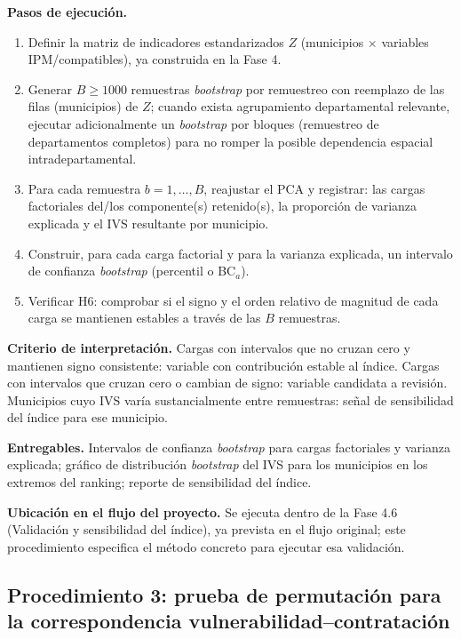 \documentclass[11pt,letterpaper]{article}
\begin{document}
\textbf{Pasos de ejecución.}
\begin{enumerate}
\item Definir la matriz de indicadores estandarizados $Z$ (municipios $\times$
variables IPM/compatibles), ya construida en la Fase 4.
\item Generar $B \geq 1000$ remuestras \textit{bootstrap} por remuestreo con
reemplazo de las filas (municipios) de $Z$; cuando exista agrupamiento
departamental relevante, ejecutar adicionalmente un \textit{bootstrap} por
bloques (remuestreo de departamentos completos) para no romper la posible
dependencia espacial intradepartamental.
\item Para cada remuestra $b=1,\dots,B$, reajustar el PCA y registrar: las
cargas factoriales del/los componente(s) retenido(s), la proporción de
varianza explicada y el IVS resultante por municipio.
\item Construir, para cada carga factorial y para la varianza explicada, un
intervalo de confianza \textit{bootstrap} (percentil o BC$_a$).
\item Verificar H6: comprobar si el signo y el orden relativo de magnitud de
cada carga se mantienen estables a través de las $B$ remuestras.
\end{enumerate}

\textbf{Criterio de interpretación.} Cargas con intervalos que no cruzan cero y
mantienen signo consistente: variable con contribución estable al índice.
Cargas con intervalos que cruzan cero o cambian de signo: variable candidata a
revisión. Municipios cuyo IVS varía sustancialmente entre remuestras: señal de
sensibilidad del índice para ese municipio.

\textbf{Entregables.} Intervalos de confianza \textit{bootstrap} para cargas
factoriales y varianza explicada; gráfico de distribución \textit{bootstrap}
del IVS para los municipios en los extremos del ranking; reporte de
sensibilidad del índice.

\textbf{Ubicación en el flujo del proyecto.} Se ejecuta dentro de la Fase 4.6
(Validación y sensibilidad del índice), ya prevista en el flujo original; este
procedimiento especifica el método concreto para ejecutar esa validación.

\subsection{Procedimiento 3: prueba de permutación para la correspondencia vulnerabilidad--contratación}
\end{document}
